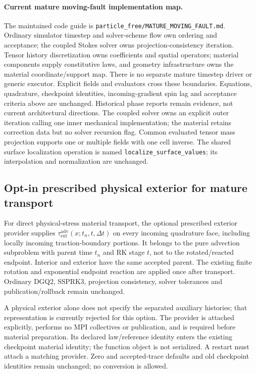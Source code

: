 \documentclass[11pt]{article}
\begin{document}
\paragraph{Current mature moving-fault implementation map.}
The maintained code guide is
\texttt{particle\_free/MATURE\_MOVING\_FAULT.md}. Ordinary simulator timestep and
solver-scheme flow own ordering and acceptance; the coupled Stokes solver owns
projection-consistency iteration. Tensor history discretization owns coefficients
and spatial operators; material components supply constitutive laws, and geometry
infrastructure owns the material coordinate/support map. There is no separate
mature timestep driver or generic executor. Explicit fields and evaluators cross
these boundaries. Equations, quadrature, checkpoint identities, incoming-gradient
spin lag and acceptance criteria above are unchanged. Historical phase reports
remain evidence, not current architectural directions. The coupled solver owns
an explicit outer iteration calling one inner mechanical implementation; the
material retains correction data but no solver recursion flag. Common evaluated
tensor mass projection supports one or multiple fields with one cell inverse.
The shared surface localization operation is named
\texttt{localize\_surface\_values}; its interpolation and normalization are unchanged.


\subsection{Opt-in prescribed physical exterior for mature transport}
For direct physical-stress material transport, the optional prescribed exterior
provider supplies $\tau_{\mathrm{ext}}^{\mathrm{adv}}(x;t_n,t,\Delta t)$ on every
incoming quadrature face, including locally incoming traction-boundary portions.
It belongs to the pure advection subproblem with parent time $t_n$ and RK stage
$t$, not to the rotated/reacted endpoint. Interior and exterior have the same
accepted parent. The existing finite rotation and exponential endpoint reaction
are applied once after transport. Ordinary DGQ2, SSPRK3, projection consistency,
solver tolerances and publication/rollback remain unchanged.

A physical exterior alone does not specify the separated auxiliary histories;
that representation is currently rejected for this option. The provider is
attached explicitly, performs no MPI collectives or publication, and is required
before material preparation. Its declared law/reference identity enters the
existing checkpoint material identity; the function object is not serialized.
A restart must attach a matching provider. Zero and accepted-trace defaults and
old checkpoint identities remain unchanged; no conversion is allowed.
\end{document}
